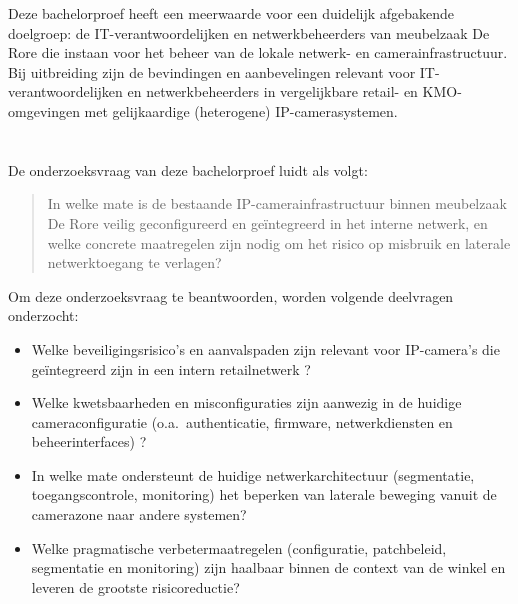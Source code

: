 Deze bachelorproef heeft een meerwaarde voor een duidelijk afgebakende doelgroep: de IT-verantwoordelijken en netwerkbeheerders van meubelzaak De Rore die instaan voor het beheer van de lokale netwerk- en camerainfrastructuur. Bij uitbreiding zijn de bevindingen en aanbevelingen relevant voor IT-verantwoordelijken en netwerkbeheerders in vergelijkbare retail- en KMO-omgevingen met gelijkaardige (heterogene) IP-camerasystemen.

\section{}%
\label{sec:onderzoeksvraag}

De onderzoeksvraag van deze bachelorproef luidt als volgt:

\begin{quote}
    In welke mate is de bestaande IP-camerainfrastructuur binnen meubelzaak De Rore veilig geconfigureerd en geïntegreerd in het interne netwerk, en welke concrete maatregelen zijn nodig om het risico op misbruik en laterale netwerktoegang te verlagen?
\end{quote}

Om deze onderzoeksvraag te beantwoorden, worden volgende deelvragen onderzocht:

\begin{itemize}
    \item Welke beveiligingsrisico’s en aanvalspaden zijn relevant voor IP-camera’s die geïntegreerd zijn in een intern retailnetwerk \parencite{ENISA2024ThreatLandscape}?
    \item Welke kwetsbaarheden en misconfiguraties zijn aanwezig in de huidige cameraconfiguratie (o.a.\ authenticatie, firmware, netwerkdiensten en beheerinterfaces) \parencite{Butun2019arXivIoTSecurity}?
    \item In welke mate ondersteunt de huidige netwerkarchitectuur (segmentatie, toegangscontrole, monitoring) het beperken van laterale beweging vanuit de camerazone naar andere systemen?
    \item Welke pragmatische verbetermaatregelen (configuratie, patchbeleid, segmentatie en monitoring) zijn haalbaar binnen de context van de winkel en leveren de grootste risicoreductie?
\end{itemize}

\section{}%
\label{sec:onderzoeksdoelstelling}

